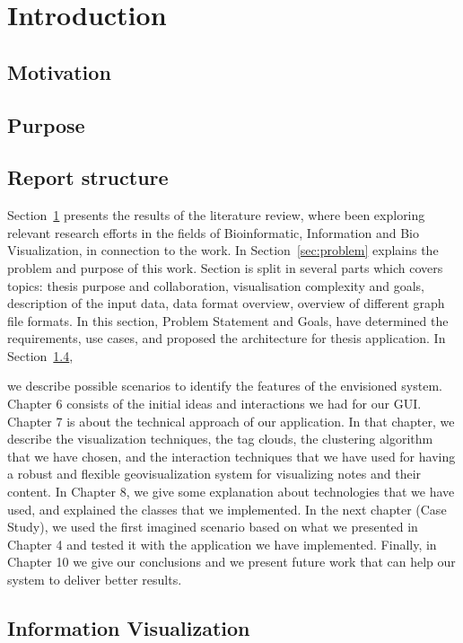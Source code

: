 \section{Introduction}
\label{sec:introduction}
\subsection{Motivation}

\subsection{Purpose}

\subsection{Report structure}
Section~\ref{sec:introduction} presents the results of the literature review, where been exploring relevant research efforts in the fields of Bioinformatic, Information and Bio Visualization, in connection to the work. In Section~\ref{sec:problem} explains the problem and purpose of this work. Section is split in several parts which covers topics: thesis purpose and collaboration, visualisation complexity and goals, description of the input data, data format overview, overview of different graph file formats. In this section, Problem Statement and Goals, have determined the requirements, use cases, and proposed the architecture for thesis application. In Section~\ref{},


we describe possible scenarios to identify the features of the envisioned system.  Chapter 6 consists of the initial ideas and interactions we had for our GUI. Chapter 7 is about the technical approach of our application. In that chapter, we describe the visualization techniques, the tag clouds, the clustering algorithm that we have chosen, and the interaction techniques that we have used for having a robust and flexible geovisualization system for visualizing notes and their content. In Chapter 8, we give some explanation about technologies that we have used, and explained the classes that we implemented. In the next chapter (Case Study), we used the first imagined scenario based on what we presented in Chapter 4 and tested it with the application we have implemented. Finally, in Chapter 10 we give our conclusions and we present future work that can help our system to deliver better results.

\subsection{Information Visualization}

